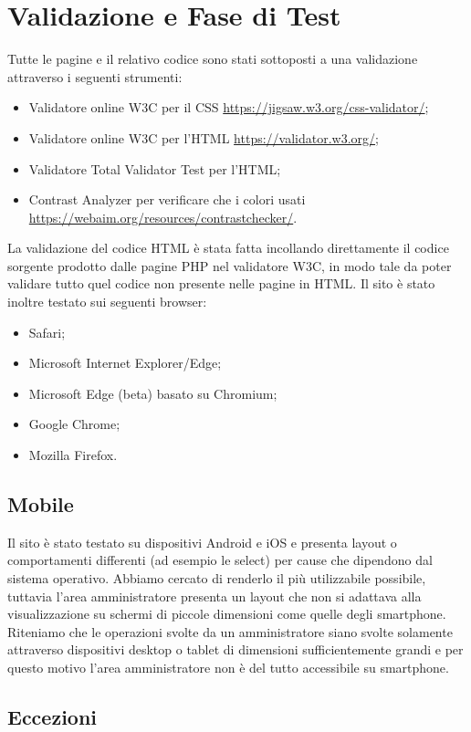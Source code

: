 \section{Validazione e Fase di Test}
Tutte le pagine e il relativo codice sono stati sottoposti a una validazione attraverso i seguenti strumenti:
    \begin{itemize}
        \item Validatore online W3C per il CSS \url{https://jigsaw.w3.org/css-validator/};
        \item Validatore online W3C per l'HTML \url{https://validator.w3.org/};
        \item Validatore Total Validator Test per l'HTML;
        \item Contrast Analyzer per verificare che i colori usati \url{https://webaim.org/resources/contrastchecker/}.
    \end{itemize}
    La validazione del codice HTML è stata fatta incollando direttamente il codice sorgente prodotto dalle pagine PHP nel validatore W3C, in modo tale da poter validare tutto quel codice non presente nelle pagine in HTML.
    Il sito è stato inoltre testato sui seguenti browser:
    \begin{itemize}
        \item Safari;
        \item Microsoft Internet Explorer/Edge;
        \item Microsoft Edge (beta) basato su Chromium;
        \item Google Chrome;
        \item Mozilla Firefox.
    \end{itemize}
        \subsection{Mobile}
        Il sito è stato testato su dispositivi Android e iOS e presenta layout o comportamenti differenti (ad esempio le select) per cause che dipendono dal sistema operativo. Abbiamo cercato di renderlo il più utilizzabile possibile, tuttavia l'area amministratore presenta un layout che non si adattava alla visualizzazione su schermi di piccole dimensioni come quelle degli smartphone. Riteniamo che le operazioni svolte da un amministratore siano svolte solamente attraverso dispositivi desktop o tablet di dimensioni sufficientemente grandi e per questo motivo l'area amministratore non è del tutto accessibile su smartphone.

	\subsection{Eccezioni}
\pagebreak